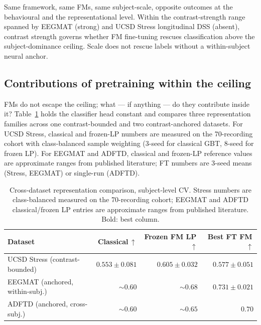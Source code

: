 Same framework, same FMs, same subject-scale, opposite outcomes at
the behavioural and the representational level. Within the
contrast-strength range spanned by EEGMAT (strong) and UCSD Stress
longitudinal DSS (absent), contrast strength governs whether FM
fine-tuning rescues classification above the subject-dominance
ceiling. Scale does not rescue labels without a within-subject
neural anchor.

\subsection{Contributions of pretraining within the ceiling}
\label{sec:results_fm_adds}

FMs do not escape the ceiling; what --- if anything --- do they
contribute inside it? Table~\ref{tab:fm_value_cross_dataset} holds
the classifier head constant and compares three representation
families across one contrast-bounded and two contrast-anchored
datasets. For UCSD Stress, classical and frozen-LP numbers are
measured on the 70-recording cohort with class-balanced sample
weighting (3-seed for classical GBT, 8-seed for frozen LP). For
EEGMAT and ADFTD, classical and frozen-LP reference values are
approximate ranges from published literature; FT numbers are 3-seed
means (Stress, EEGMAT) or single-run (ADFTD).

\begin{table}[!t]
\centering
\small
\caption{Cross-dataset representation comparison, subject-level CV.
  Stress numbers are class-balanced measured on the 70-recording
  cohort; EEGMAT and ADFTD classical/frozen LP entries are
  approximate ranges from published literature. Bold: best column.}
\label{tab:fm_value_cross_dataset}
\begin{tabular}{lrrr}
\toprule
Dataset                        & Classical\,$\uparrow$ & Frozen FM LP\,$\uparrow$ & Best FT FM\,$\uparrow$ \\
\midrule
UCSD Stress (contrast-bounded)      & $0.553 \pm 0.081$ & $\mathbf{0.605 \pm 0.032}$ & $0.577 \pm 0.051$ \\
EEGMAT (anchored, within-subj.)     & $\sim\!0.60$      & $\sim\!0.68$              & $\mathbf{0.731 \pm 0.021}$ \\
ADFTD (anchored, cross-subj.)       & $\sim\!0.60$      & $\sim\!0.65$              & $\mathbf{0.70}$ \\
\bottomrule
\end{tabular}
\end{table}

